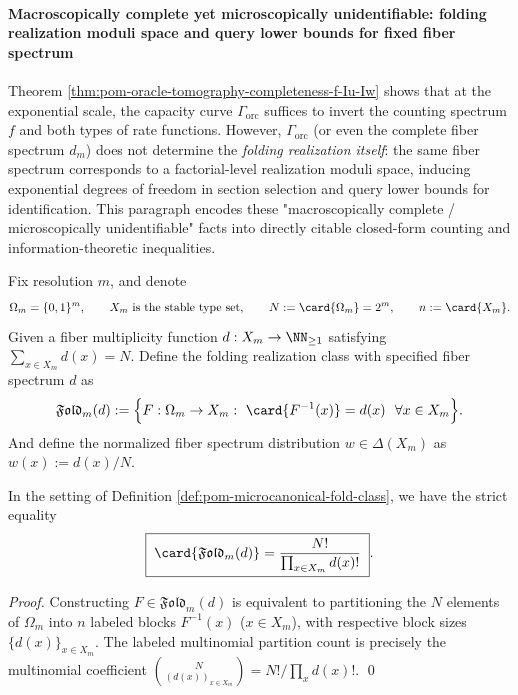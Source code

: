 \paragraph{Macroscopically complete yet microscopically unidentifiable: folding realization moduli space and query lower bounds for fixed fiber spectrum}
Theorem \ref{thm:pom-oracle-tomography-completeness-f-Iu-Iw} shows that at the exponential scale, the capacity curve \(\Gamma_{\mathrm{orc}}\) suffices to invert the counting spectrum \(f\) and both types of rate functions.
However, \(\Gamma_{\mathrm{orc}}\) (or even the complete fiber spectrum \(d_m\)) does not determine the \emph{folding realization itself}: the same fiber spectrum corresponds to a factorial-level realization moduli space, inducing exponential degrees of freedom in section selection and query lower bounds for identification.
This paragraph encodes these "macroscopically complete / microscopically unidentifiable" facts into directly citable closed-form counting and information-theoretic inequalities.

\begin{definition}\label{def:pom-microcanonical-fold-class}
Fix resolution \(m\), and denote
\[
\Omega_m=\{0,1\}^m,
\qquad
X_m\ \text{is the stable type set},
\qquad
N:=\card{\Omega_m}=2^m,
\qquad
n:=\card{X_m}.
\]
Given a fiber multiplicity function \(d:X_m\to\NN_{\ge 1}\) satisfying \(\sum_{x\in X_m}d(x)=N\).
Define the folding realization class with specified fiber spectrum \(d\) as
\[
\mathfrak{Fold}_m(d)
:=\Bigl\{F:\Omega_m\to X_m:\ \card{F^{-1}(x)}=d(x)\ \ \forall x\in X_m\Bigr\}.
\]
And define the normalized fiber spectrum distribution \(w\in\Delta(X_m)\) as \(w(x):=d(x)/N\).
\end{definition}

\begin{theorem}\label{thm:pom-microcanonical-fold-class-count}
In the setting of Definition \ref{def:pom-microcanonical-fold-class}, we have the strict equality
\[
\boxed{\;
\card{\mathfrak{Fold}_m(d)}=\frac{N!}{\prod_{x\in X_m} d(x)!}\; } .
\]
\end{theorem}
\begin{proof}
Constructing \(F\in\mathfrak{Fold}_m(d)\) is equivalent to partitioning the \(N\) elements of \(\Omega_m\) into \(n\) labeled blocks \(F^{-1}(x)\) (\(x\in X_m\)), with respective block sizes \(\{d(x)\}_{x\in X_m}\).
The labeled multinomial partition count is precisely the multinomial coefficient
\(
\binom{N}{(d(x))_{x\in X_m}}=N!/\prod_x d(x)!
\).
\qed
\end{proof}

